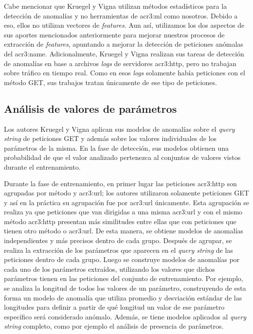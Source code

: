 Cabe mencionar que Kruegel y Vigna utilizan métodos estadísticos para
la detección de anomalías y no herramientas de \gls{acr3:ml} como nosotros.
Debido a eso, ellos no utilizan vectores de \textit{features}.
Aun así, utilizamos los dos aspectos de sus aportes mencionados anteriormente
para mejorar nuestros procesos de extracción de \textit{features}, apuntando
a mejorar la detección de peticiones anómalas del \gls{acr3:name}.
Adicionalmente, Kruegel y Vigna realizan sus tareas de detección de
anomalías en base a archivos \textit{logs} de servidores \gls{acr3:http},
pero no trabajan sobre tráfico en tiempo real. Como en esos \textit{logs}
solamente había peticiones con el método GET, sus trabajos tratan únicamente
de ese tipo de peticiones.


\subsection{Análisis de valores de parámetros}

Los autores Kruegel y Vigna aplican sus modelos de anomalías sobre el
\textit{query string} de peticiones GET y además sobre los valores individuales
de los parámetros de la misma. En la fase de detección, sus modelos obtienen
una probabilidad de que el valor analizado pertenezca al conjuntos de valores
vistos durante el entrenamiento.

Durante la fase de entrenamiento, en primer lugar las peticiones
\gls{acr3:http} son agrupadas por método y \gls{acr3:url}; los autores
utilizaron solamente peticiones GET y así en la práctica su agrupación
fue por \gls{acr3:url} únicamente.
Esta agrupación se realiza ya que peticiones que van dirigidas a una misma
\gls{acr3:url} y con el mismo método \gls{acr3:http} presentan más
similitudes entre ellas que con peticiones que tienen otro método o
\gls{acr3:url}. De esta manera, se obtiene modelos de anomalías
independientes y más precisos dentro de cada grupo.
Después de agrupar, se realiza la extracción de los parámetros que aparecen
en el \textit{query string} de las peticiones dentro de cada grupo. Luego
se construye modelos de anomalías por cada uno de los parámetros extraídos,
utilizando los valores que dichos parámetros tienen en las peticiones del
conjunto de entrenamiento.
Por ejemplo, se analiza la longitud de todos los valores de un parámetro,
construyendo de esta forma un modelo de anomalía que utiliza promedio
y desviación estándar de las longitudes para definir a partir de qué
longitud un valor de ese parámetro específico será considerado anómalo.
Además, se tiene modelos aplicados al \textit{query string} completo,
como por ejemplo el análisis de presencia de parámetros.

